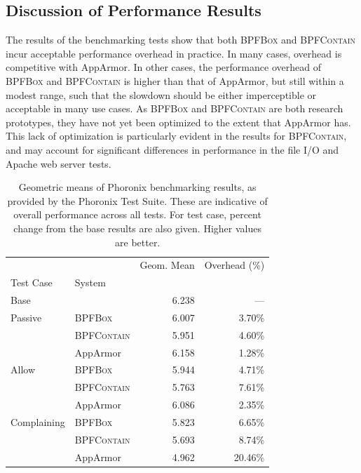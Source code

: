 \documentclass[
  fontsize=12pt,
  titlepage=firstiscover,
  paper=letter,
oneside,
  cleardoublepage=plain,
  parskip=half-,
  DIV=10,
  parindent,
  appendixprefix,
  chapterprefix,
  listof=totoc,
]{scrbook}
\newcommand{\bpfbox}{\textsc{BPFBox}}
\newcommand{\bpfcontain}{\textsc{BPFContain}}
\begin{document}
\subsection{Discussion of Performance Results}\label{ss:eval-performance-discussion}

The results of the benchmarking tests show that both \bpfbox{} and \bpfcontain{} incur
acceptable performance overhead in practice. In many cases, overhead is competitive with
AppArmor. In other cases, the performance overhead of \bpfbox{} and \bpfcontain{} is
higher than that of AppArmor, but still within a modest range, such that the slowdown
should be either imperceptible or acceptable in many use cases.  As \bpfbox{}
and \bpfcontain{} are both research prototypes, they have not yet been optimized to the
extent that AppArmor has. This lack of optimization is particularly evident in the results
for \bpfcontain{}, and may account for significant differences in performance in the file
I/O and Apache web server tests.

\begin{table}[ht]
  \centering
  \footnotesize
  \caption[Geometric means of Phoronix benchmarking results]{
    Geometric means of Phoronix benchmarking results, as provided by the Phoronix Test
    Suite. These are indicative of overall performance across all tests. For test case,
    percent change from the base results are also given. Higher values are better.
  }\label{tab:phoronix-geometric}
  \begin{tabular}{llrr}
  \toprule
             &               & Geom. Mean & Overhead (\%)\\
   Test Case & System        &            &              \\
   \midrule
   Base      &               & 6.238          & --- \\
   \cline{1-4}
   Passive   & \bpfbox{}     & 6.007          & 3.70\% \\
             & \bpfcontain{} & 5.951          & 4.60\% \\
             & AppArmor      & 6.158          & 1.28\% \\
   \cline{1-4}
   Allow     & \bpfbox{}     & 5.944          & 4.71\% \\
             & \bpfcontain{} & 5.763          & 7.61\% \\
             & AppArmor      & 6.086          & 2.35\% \\
   \cline{1-4}
   Complaining  & \bpfbox{}     & 5.823          & 6.65\% \\
             & \bpfcontain{} & 5.693          & 8.74\% \\
             & AppArmor      & 4.962          & 20.46\% \\
  \bottomrule
  \end{tabular}
\end{table}
\end{document}
